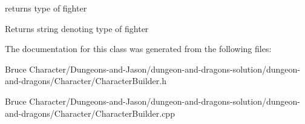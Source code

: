 returns type of fighter \begin{DoxyReturn}{Returns}
string denoting type of fighter 
\end{DoxyReturn}


The documentation for this class was generated from the following files\+:\begin{DoxyCompactItemize}
\item 
Bruce Character/\+Dungeons-\/and-\/\+Jason/dungeon-\/and-\/dragons-\/solution/dungeon-\/and-\/dragons/\+Character/Character\+Builder.\+h\item 
Bruce Character/\+Dungeons-\/and-\/\+Jason/dungeon-\/and-\/dragons-\/solution/dungeon-\/and-\/dragons/\+Character/Character\+Builder.\+cpp\end{DoxyCompactItemize}
